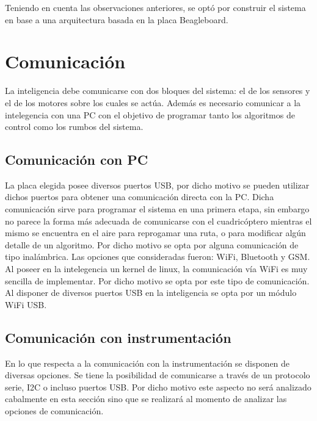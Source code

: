 \documentclass[main]{subfiles}
\begin{document}
Teniendo en cuenta las observaciones anteriores, se opt\'o por construir el sistema en base a una arquitectura basada en la placa Beagleboard.

\newpage
\section{Comunicaci\'on}
\vspace*{15pt}

La inteligencia debe comunicarse con dos bloques del sistema: el de los sensores y el de los motores sobre los cuales se act\'ua. Adem\'as es necesario comunicar a la intelegencia con una PC con el objetivo de programar tanto los algoritmos de control como los rumbos del sistema. 
 
\subsection{Comunicaci\'on con PC}
\vspace*{15pt}
La placa elegida posee diversos puertos USB, por dicho motivo se pueden utilizar dichos puertos para obtener una comunicaci\'on directa con la PC. Dicha comunicaci\'on sirve para programar el sistema en una primera etapa, sin embargo no parece la forma m\'as adecuada de comunicarse con el cuadric\'optero mientras el mismo se encuentra en el aire para reprogamar una ruta, o para modificar alg\'un detalle de un algoritmo. Por dicho motivo se opta por alguna comunicaci\'on de tipo inal\'ambrica. Las opciones que consideradas fueron: WiFi, Bluetooth y GSM. Al poseer en la intelegencia un kernel de linux, la comunicaci\'on v\'ia WiFi es muy sencilla de implementar. Por dicho motivo se opta por este tipo de comunicaci\'on. Al disponer de diversos puertos USB en la inteligencia se opta por un m\'odulo WiFi USB.    


\subsection{Comunicaci\'on con instrumentaci\'on}
\vspace*{15pt}

En lo que respecta a la comunicaci\'on con la instrumentaci\'on se disponen de diversas opciones. Se tiene la posibilidad de comunicarse a trav\'es de un protocolo serie, I2C o incluso puertos USB. Por dicho motivo este aspecto no ser\'a analizado cabalmente en esta secci\'on sino que se realizar\'a al momento de analizar las opciones de comunicaci\'on.  
\end{document}
